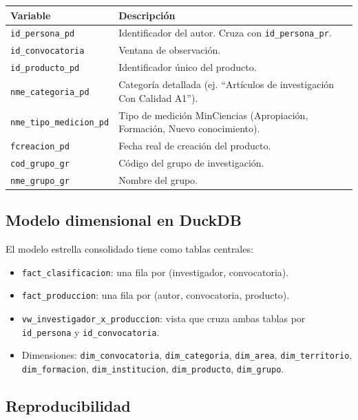 \documentclass[11pt,a4paper,oneside]{article}
\begin{document}
\begin{tabularx}{\linewidth}{l X}
\toprule
\textbf{Variable} & \textbf{Descripción} \\
\midrule
\texttt{id\_persona\_pd} & Identificador del autor. Cruza con \texttt{id\_persona\_pr}. \\
\texttt{id\_convocatoria} & Ventana de observación. \\
\texttt{id\_producto\_pd} & Identificador único del producto. \\
\texttt{nme\_categoria\_pd} & Categoría detallada (ej. ``Artículos de investigación Con Calidad A1''). \\
\texttt{nme\_tipo\_medicion\_pd} & Tipo de medición MinCiencias (Apropiación, Formación, Nuevo conocimiento). \\
\texttt{fcreacion\_pd} & Fecha real de creación del producto. \\
\texttt{cod\_grupo\_gr} & Código del grupo de investigación. \\
\texttt{nme\_grupo\_gr} & Nombre del grupo. \\
\bottomrule
\end{tabularx}

\subsection{Modelo dimensional en DuckDB}

El modelo estrella consolidado tiene como tablas centrales:

\begin{itemize}
\item \texttt{fact\_clasificacion}: una fila por (investigador, convocatoria).
\item \texttt{fact\_produccion}: una fila por (autor, convocatoria, producto).
\item \texttt{vw\_investigador\_x\_produccion}: vista que cruza ambas tablas por \texttt{id\_persona} y \texttt{id\_convocatoria}.
\item Dimensiones: \texttt{dim\_convocatoria}, \texttt{dim\_categoria}, \texttt{dim\_area}, \texttt{dim\_territorio}, \texttt{dim\_formacion}, \texttt{dim\_institucion}, \texttt{dim\_producto}, \texttt{dim\_grupo}.
\end{itemize}

\subsection{Reproducibilidad}
\end{document}
